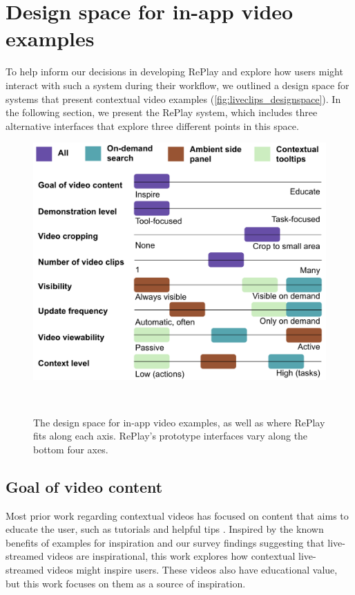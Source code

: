 \section{Design space for in-app video examples}
To help inform our decisions in developing RePlay and explore how users might interact with such a system during their workflow, we outlined a design space for systems that present contextual video examples (\autoref{fig:liveclips_designspace}). In the following section, we present the RePlay system, which includes three alternative interfaces that explore three different points in this space.

\begin{figure}[b!]
\centering
  \includegraphics[width=\columnwidth]{liveclips/figures/designspace.png}
  \caption{The design space for in-app video examples, as well as where RePlay fits along each axis. RePlay's prototype interfaces vary along the bottom four axes. }~\label{fig:liveclips_designspace}
\end{figure}

\subsection{Goal of video content}
Most prior work regarding contextual videos has focused on content that aims to educate the user, such as tutorials \cite{Pongnumkul2011} and helpful tips \cite{Grossman2010a}. Inspired by the known benefits of examples for inspiration \cite{Kulkarni2014} and our survey findings suggesting that live-streamed videos are inspirational, this work explores how contextual live-streamed videos might inspire users. These videos also have educational value, but this work focuses on them as a source of inspiration. 

